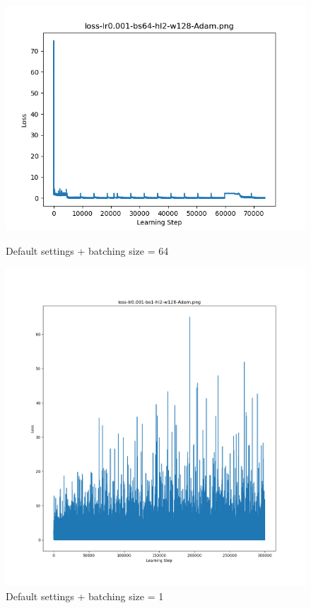 \documentclass{article}[12pt]
\begin{document}
    \begin{figure}[H]
        \includegraphics[width=\linewidth]{testsResults/loss/bs/def.png}
        \caption{Default settings + batching size = 64}
        \endminipage\hfill
        \includegraphics[width=\linewidth]{testsResults/loss/bs/loss-1batch.png}
        \caption{Default settings + batching size = 1}
        \endminipage
    \end{figure}
\end{document}
